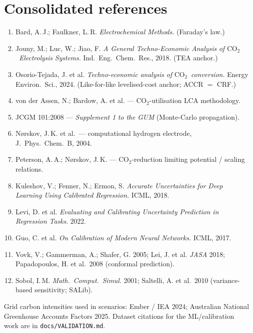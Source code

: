 \documentclass[11pt,a4paper]{article}
\newcommand{\co}{\ensuremath{\mathrm{CO_2}}}
\begin{document}
\section*{Consolidated references}
\begin{enumerate}[nosep,leftmargin=1.4em]
\item Bard, A.\,J.; Faulkner, L.\,R. \emph{Electrochemical Methods.} (Faraday's law.)
\item Jouny, M.; Luc, W.; Jiao, F. \emph{A General Techno-Economic Analysis of
\co\ Electrolysis Systems.} Ind.\ Eng.\ Chem.\ Res., 2018. (TEA anchor.)
\item Osorio-Tejada, J. et al. \emph{Techno-economic analysis of \co\ conversion.}
Energy Environ.\ Sci., 2024. (Like-for-like levelised-cost anchor; ACCR $=$ CRF.)
\item von der Assen, N.; Bardow, A. et al. --- \co-utilisation LCA methodology.
\item JCGM 101:2008 --- \emph{Supplement 1 to the GUM} (Monte-Carlo propagation).
\item N{\o}rskov, J.\,K. et al.\ --- computational hydrogen electrode, J.\ Phys.\
Chem.\ B, 2004.
\item Peterson, A.\,A.; N{\o}rskov, J.\,K. --- \co-reduction limiting potential /
scaling relations.
\item Kuleshov, V.; Fenner, N.; Ermon, S. \emph{Accurate Uncertainties for Deep
Learning Using Calibrated Regression.} ICML, 2018.
\item Levi, D. et al. \emph{Evaluating and Calibrating Uncertainty Prediction in
Regression Tasks.} 2022.
\item Guo, C. et al. \emph{On Calibration of Modern Neural Networks.} ICML, 2017.
\item Vovk, V.; Gammerman, A.; Shafer, G. 2005; Lei, J. et al. \emph{JASA} 2018;
Papadopoulos, H. et al.\ 2008 (conformal prediction).
\item Sobol, I.\,M. \emph{Math.\ Comput.\ Simul.} 2001; Saltelli, A. et al.\ 2010
(variance-based sensitivity; SALib).
\end{enumerate}

\noindent\small Grid carbon intensities used in scenarios: Ember / IEA 2024;
Australian National Greenhouse Accounts Factors 2025. Dataset citations for the
ML/calibration work are in \texttt{docs/VALIDATION.md}.
\end{document}
